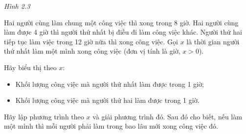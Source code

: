 \begin{exercises}
\begin{questions}[series=SGK]
        \begin{center}

            \textit{Hình 2.3}
        \end{center}

        \answerline
        \answerline
        \answerline
        \answerline

        \item Hai người cùng làm chung một công việc thì xong trong 8 giờ. Hai người cùng làm được 4 giờ thì người thứ nhất bị điều đi làm công việc khác. Người thứ hai tiếp tục làm việc trong 12 giờ nữa thì xong công việc. Gọi $x$ là thời gian người thứ nhất làm một mình xong công việc (đơn vị tính là giờ, $x>0$).
        \begin{questions}
            \item Hãy biểu thị theo $x$:
            \begin{itemize}
                \item Khối lượng công việc mà người thứ nhất làm được trong 1 giờ;
                \item Khối lượng công việc mà người thứ hai làm được trong 1 giờ.
            \end{itemize}

            \answerline
            \answerline
            \item Hãy lập phương trình theo $x$ và giải phương trình đó. Sau đó cho biết, nếu làm một mình thì mỗi người phải làm trong bao lâu mới xong công việc đó.

            \answerline
            \answerline
            \answerline
            \answerline
        \end{questions}
    \end{questions}
\end{exercises}

